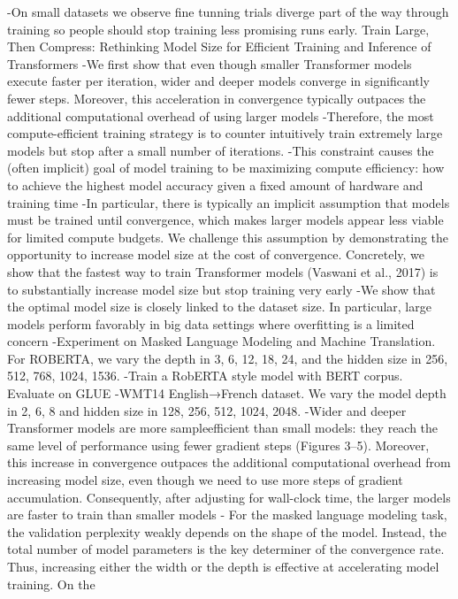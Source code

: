 -On small datasets we observe fine tunning trials diverge part of the way through training so people should stop training less promising runs early.
Train Large, Then Compress: Rethinking Model Size for Efficient Training and Inference of Transformers
-We first show that even though smaller Transformer models execute faster per iteration, wider and deeper models converge in significantly fewer steps. Moreover, this acceleration in convergence typically outpaces the additional computational overhead of using larger models
-Therefore, the most compute-efficient training strategy is to counter intuitively train extremely large models but stop after a small number of iterations.
-This constraint causes the (often implicit) goal of
model training to be maximizing compute efficiency: how
to achieve the highest model accuracy given a fixed amount
of hardware and training time
-In particular, there
is typically an implicit assumption that models must be
trained until convergence, which makes larger models appear less viable for limited compute budgets. We challenge
this assumption by demonstrating the opportunity to increase model size at the cost of convergence. Concretely,
we show that the fastest way to train Transformer models (Vaswani et al., 2017) is to substantially increase model
size but stop training very early
-We show that the optimal
model size is closely linked to the dataset size. In particular,
large models perform favorably in big data settings where
overfitting is a limited concern
-Experiment on Masked Language Modeling and Machine Translation. 
 For ROBERTA, we
vary the depth in {3, 6, 12, 18, 24}, and the hidden size in
{256, 512, 768, 1024, 1536}.
-Train a RobERTA style model with BERT corpus. Evaluate on GLUE
-WMT14 English→French dataset. We vary the model depth in
{2, 6, 8} and hidden size in {128, 256, 512, 1024, 2048}.
-Wider and deeper Transformer models are more sampleefficient than small models: they reach the same level of
performance using fewer gradient steps (Figures 3–5). Moreover, this increase in convergence outpaces the additional
computational overhead from increasing model size, even
though we need to use more steps of gradient accumulation.
Consequently, after adjusting for wall-clock time, the larger
models are faster to train than smaller models
- For the
masked language modeling task, the validation perplexity
weakly depends on the shape of the model. Instead, the
total number of model parameters is the key determiner of
the convergence rate. Thus, increasing either the width or
the depth is effective at accelerating model training. On the
